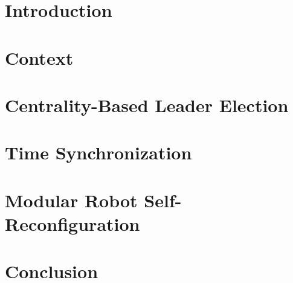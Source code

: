 \documentclass[english]{spimufcphdthesis}
\begin{document}
\listoffigures

\listoftables


\myPrintGlossary

\mainmatter

\mtcaddchapter
\mtcaddchapter
\mtcaddchapter
\mtcaddchapter
\mtcaddchapter
\mtcaddchapter
 
\chapter{Introduction}
\label{chapter:introduction}


\chapter{Context}
\label{chapter:context}
\minitoc
\newpage


\chapter{Centrality-Based Leader Election}
\label{chapter:centrality}

\minitoc
\newpage


\chapter{Time Synchronization}
\label{chapter:time-synchronization}
\minitoc
\newpage


\chapter{Modular Robot Self-Reconfiguration}
\label{chapter:self-reconfiguration}
\minitoc
\newpage


\chapter{Conclusion}
\label{chapter:conclusion}

\end{document}
